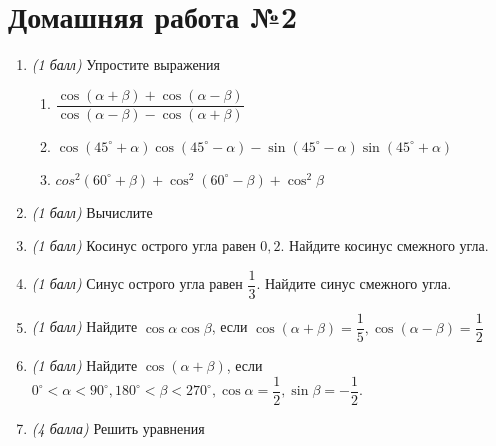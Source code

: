 \documentclass[12pt, a4paper]{article}
\begin{document}
	
	\section*{Домашняя работа №2}
	\begin{enumerate}
		\item \textit{(1 балл)} Упростите выражения
		\begin{enumerate}[label=\asbuk*)]
			\item $\dfrac{\cos (\alpha+\beta)+\cos (\alpha-\beta) }{\cos (\alpha-\beta)-\cos(\alpha+\beta)}$
			\item $\cos(45^{\circ}+\alpha)\cos(45^{\circ}-\alpha)-\sin(45^{\circ}-\alpha)\sin(45^{\circ}+\alpha)$
			\item $cos^2(60^{\circ}+\beta)+\cos^2(60^{\circ}-\beta)+\cos^{2}\beta$
		\end{enumerate}
	\item \textit{(1 балл)} Вычислите
		\begin{enumerate}[label=\asbuk*)]
		\end{enumerate}
	\item \textit{(1 балл)} Косинус острого угла равен $0,2$. Найдите косинус смежного угла.
	\item \textit{(1 балл)} Синус острого угла равен $\dfrac{1}{3}$. Найдите синус смежного угла.
	\item \textit{(1 балл)} Найдите $\cos\alpha\cos\beta$, если $\cos(\alpha+\beta)=\dfrac{1}{5}, \cos(\alpha-\beta)=\dfrac{1}{2}$
	\item \textit{(1 балл)} Найдите $\cos(\alpha+\beta)$, если $0^{\circ}<\alpha<90^{\circ}, 180^{\circ}<\beta<270^{\circ}, \cos\alpha=\dfrac{1}{2}, \sin\beta=-\dfrac{1}{2}$.
	\item \textit{(4 балла)} Решить уравнения
	\begin{enumerate}[label=\asbuk*)]
	\end{enumerate}
	
\end{enumerate}
\end{document}
